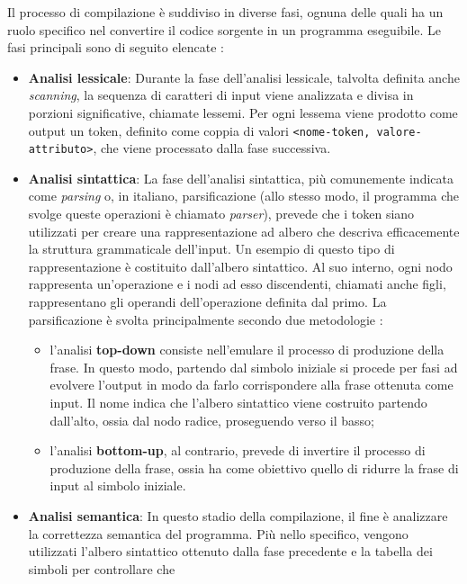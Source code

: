 \documentclass[12pt,a4paper,openright,twoside]{book}
\begin{document}
Il processo di compilazione è suddiviso in diverse fasi, ognuna delle quali ha un ruolo specifico nel convertire il codice sorgente in un 
programma eseguibile. Le fasi principali sono di seguito elencate \cite{Aho2006}:
\begin{itemize}
    \item \textbf{Analisi lessicale}: Durante la fase dell'analisi lessicale, talvolta definita anche \textit{scanning}, la sequenza di 
    caratteri di input viene analizzata e divisa in porzioni significative, chiamate lessemi. Per ogni lessema viene prodotto come output un 
    token, definito come coppia di valori \texttt{<nome-token, valore-attributo>}, che viene processato dalla fase successiva.
    \item \textbf{Analisi sintattica}: La fase dell'analisi sintattica, più comunemente indicata come \textit{parsing} o, in italiano, 
    parsificazione (allo stesso modo, il programma che svolge queste operazioni è chiamato \textit{parser}), prevede che i token siano 
    utilizzati per creare una rappresentazione ad albero che descriva efficacemente la struttura grammaticale dell'input. Un esempio di 
    questo tipo di rappresentazione è costituito dall'albero sintattico. Al suo interno, ogni nodo rappresenta un'operazione e i nodi ad 
    esso discendenti, chiamati anche figli, rappresentano gli operandi dell'operazione definita dal primo. La parsificazione è svolta 
    principalmente secondo due metodologie \cite{Grune2006}:
    \begin{itemize}
        \item l’analisi \textbf{top-down} consiste nell'emulare il processo di produzione della frase. In questo modo, partendo dal simbolo 
        iniziale si procede per fasi ad evolvere l'output in modo da farlo corrispondere alla frase ottenuta come input. Il nome indica che 
        l'albero sintattico viene costruito partendo dall'alto, ossia dal nodo radice, proseguendo verso il basso;
        \item l’analisi \textbf{bottom-up}, al contrario, prevede di invertire il processo di produzione della frase, ossia ha come obiettivo 
        quello di ridurre la frase di input al simbolo iniziale.
    \end{itemize}
    \item \textbf{Analisi semantica}: In questo stadio della compilazione, il fine è analizzare la correttezza semantica del programma. Più 
    nello specifico, vengono utilizzati l'albero sintattico ottenuto dalla fase precedente e la tabella dei simboli per controllare che 

\end{itemize}
\end{document}
